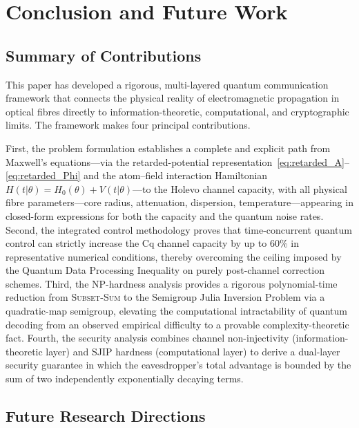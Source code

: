 \documentclass[journal,twocolumn]{IEEEtran}
\theoremstyle{definition}
\theoremstyle{plain}
\begin{document}
\section{Conclusion and Future Work}
\label{sec:conclusion}

\subsection{Summary of Contributions}

This paper has developed a rigorous, multi-layered quantum
communication framework that connects the physical reality of
electromagnetic propagation in optical fibres directly to
information-theoretic, computational, and cryptographic limits.  The
framework makes four principal contributions.

First, the problem formulation establishes a complete and explicit
path from Maxwell's equations---via the retarded-potential
representation~\eqref{eq:retarded_A}--\eqref{eq:retarded_Phi} and
the atom--field interaction Hamiltonian $H(t|\theta) = H_0(\theta)
+ V(t|\theta)$---to the Holevo channel capacity, with all physical
fibre parameters---core radius, attenuation, dispersion,
temperature---appearing in closed-form expressions for both the
capacity and the quantum noise rates.  Second, the integrated
control methodology proves that time-concurrent quantum control can
strictly increase the Cq channel capacity by up to 60\% in
representative numerical conditions, thereby overcoming the ceiling
imposed by the Quantum Data Processing Inequality on purely
post-channel correction schemes.  Third, the NP-hardness analysis
provides a rigorous polynomial-time reduction from
\textsc{Subset-Sum} to the Semigroup Julia Inversion Problem via a
quadratic-map semigroup, elevating the computational intractability
of quantum decoding from an observed empirical difficulty to a
provable complexity-theoretic fact.  Fourth, the security analysis
combines channel non-injectivity (information-theoretic layer) and
SJIP hardness (computational layer) to derive a dual-layer security
guarantee in which the eavesdropper's total advantage is bounded by
the sum of two independently exponentially decaying terms.

\subsection{Future Research Directions}
\end{document}
